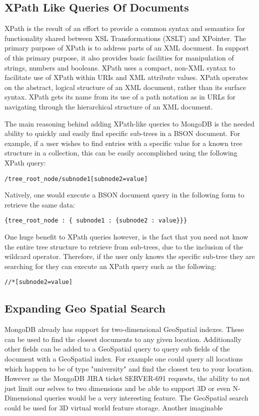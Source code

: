 \documentclass{dependencies/acm_proc_article-sp}
\begin{document}
\subsection{XPath Like Queries Of Documents}
XPath is the result of an effort to provide a common syntax and semantics for functionality shared between XSL Transformations (XSLT) and XPointer.
The primary purpose of XPath is to address parts of an XML document\cite{10}.
In support of this primary purpose, it also provides basic facilities for manipulation of strings, numbers and booleans.
XPath uses a compact, non-XML syntax to facilitate use of XPath within URIs and XML attribute values.
XPath operates on the abstract, logical structure of an XML document, rather than its surface syntax.
XPath gets its name from its use of a path notation as in URLs for navigating through the hierarchical structure of an XML document.

The main reasoning behind adding XPath-like queries to MongoDB is the needed ability to quickly and easily find specific sub-trees in a BSON document.
For example, if a user wishes to find entries with a specific value for a known tree structure in a collection, this can be easily accomplished using the following XPath query:
\begin{lstlisting}
/tree_root_node/subnode1[subnode2=value]
\end{lstlisting}
Natively, one would execute a BSON document query in the following form to retrieve the same data:
\begin{lstlisting}
{tree_root_node : { subnode1 : {subnode2 : value}}}
\end{lstlisting}
One huge benefit to XPath queries however, is the fact that you need not know the entire tree structure to retrieve from sub-trees, due to the inclusion of the wildcard operator.
Therefore, if the user only knows the specific sub-tree they are searching for they can execute an XPath query such as the following:
\begin{lstlisting}
//*[subnode2=value]
\end{lstlisting}


\subsection{Expanding Geo Spatial Search}
MongoDB already has support for two-dimensional GeoSpatial indexes.
These can be used to find the closest documents to any given location.
Additionally other fields can be added to a GeoSpatial query to query sub fields
of the document with a GeoSpatial index. For example one could query all locations
which happen to be of type "university" and find the closest ten to your location.
However as the MongoDB JIRA ticket SERVER-691 \cite{9} requests, the ability to
not just limit our selves to two dimensions and be able to support 3D or even N-Dimensional
queries would be a very interesting feature. The GeoSpatial search could be used for
3D virtual world feature storage. Another imaginable
\end{document}
